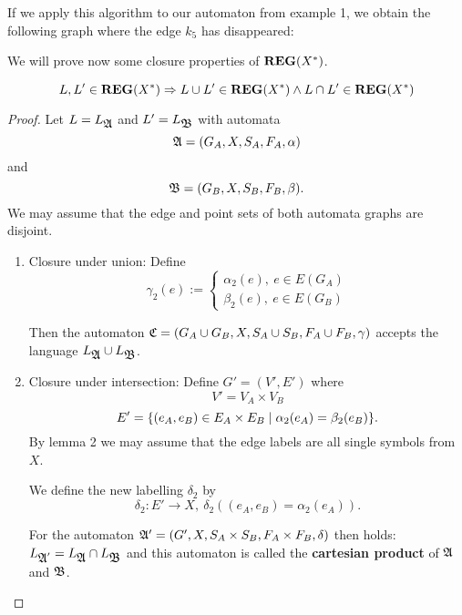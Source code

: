 If we apply this algorithm to our automaton from example 1, we obtain the
following graph where the edge $k_5$ has disappeared:

\begin{center}

\end{center}

\bigskip
We will prove now some closure properties of $\mbox{{\bf REG}}(X^*)$.

\begin{theorem}
\[ L, L' \in \mbox{{\bf REG}}(X^*) \Rightarrow L \cup L' \in \mbox{{\bf REG}}(X^*) \wedge L \cap L' \in
\mbox{{\bf REG}}(X^*) \]
\end{theorem}

\begin{proof}
Let $L = L_{\mbox{$\mathfrak{A}$}}$ and $L' = L_{\mbox{$\mathfrak{B}$}}$ with automata \[
\mbox{$\mathfrak{A}$} = (G_A, X, S_A, F_A, \alpha) \] and \[ \mbox{$\mathfrak{B}$} = (G_B, X, S_B,
F_B, \beta).\]
We may assume that the edge and point sets of both automata graphs are disjoint.

\begin{enumerate}
  
  \item Closure under union: Define
	\[ \gamma_2(e) := \left\{
		\begin{array}{l} 
		\alpha_2(e),\ e \in E(G_A) \\
		\beta_2(e),\ e \in E(G_B)
		\end{array}
	 \right. \]

	Then the automaton $\mbox{$\mathfrak{C}$} = (G_A \cup G_B, X, S_A \cup S_B, F_A \cup
	F_B, \gamma)$ accepts the language $L_{\mbox{$\mathfrak{A}$}} \cup L_{\mbox{$\mathfrak{B}$}}$.
	
	\begin{center}
	
	\end{center}
	
	\item Closure under intersection: Define $G' = (V', E')$ where
	\[ V' = V_A \times V_B \]
	\[ E' = \mbox{$\{(e_A, e_B) \in E_A \times E_B \mid \alpha_2(e_A) = \beta_2(e_B)\}$}
	. \]
	By lemma 2 we may assume that the edge labels are all single symbols from $X$.
	
	We define the new labelling $\delta_2$ by \[ \delta_2 : E' \to X,\
	\delta_2((e_A, e_B) = \alpha_2(e_A)). \]
	
	For the automaton $\mbox{$\mathfrak{A'}$} = (G', X, S_A \times S_B, F_A \times F_B,
	\delta)$ then holds: $L_{\mbox{$\mathfrak{A}$}'} = L_{\mbox{$\mathfrak{A}$}} \cap L_{\mbox{$\mathfrak{B}$}}$
	and this automaton is called the {\bf cartesian product} of $\mbox{$\mathfrak{A}$}$ and
	$\mbox{$\mathfrak{B}$}$.
\end{enumerate}
\end{proof}

